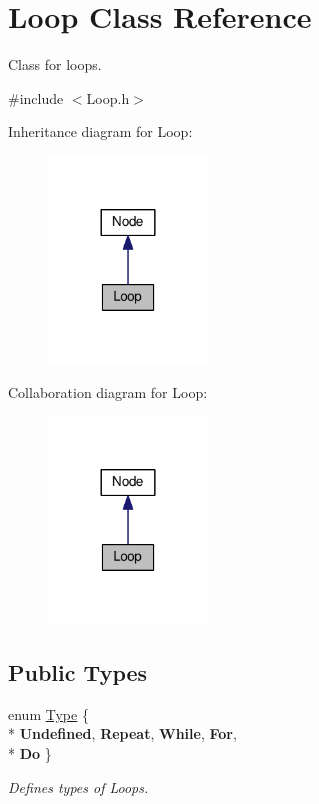 \hypertarget{classLoop}{}\section{Loop Class Reference}
\label{classLoop}


Class for loops.  




{\ttfamily \#include $<$Loop.\+h$>$}



Inheritance diagram for Loop\+:\nopagebreak
\begin{figure}[H]
\begin{center}
\leavevmode
\includegraphics[width=120pt]{classLoop__inherit__graph}
\end{center}
\end{figure}


Collaboration diagram for Loop\+:\nopagebreak
\begin{figure}[H]
\begin{center}
\leavevmode
\includegraphics[width=120pt]{classLoop__coll__graph}
\end{center}
\end{figure}
\subsection*{Public Types}
\begin{DoxyCompactItemize}
\item 
\hypertarget{classLoop_af57e9c094063c514758dfe7bd986d6e7}{}enum \hyperlink{classLoop_af57e9c094063c514758dfe7bd986d6e7}{Type} \{ \\*
{\bfseries Undefined}, 
{\bfseries Repeat}, 
{\bfseries While}, 
{\bfseries For}, 
\\*
{\bfseries Do}
 \}\label{classLoop_af57e9c094063c514758dfe7bd986d6e7}

\begin{DoxyCompactList}\small\item\em Defines types of Loops. \end{DoxyCompactList}\end{DoxyCompactItemize}
